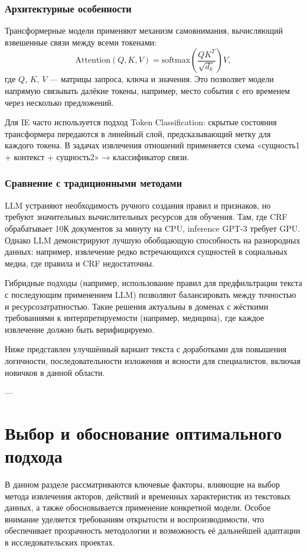 \subsubsection{Архитектурные особенности}

Трансформерные модели применяют механизм самовнимания, вычисляющий взвешенные связи между всеми токенами:
\[
\text{Attention}(Q, K, V) = \text{softmax}\left(\frac{QK^T}{\sqrt{d_k}}\right)V,
\]
где \(Q\), \(K\), \(V\) — матрицы запроса, ключа и значения. Это позволяет модели напрямую связывать далёкие токены, например, место события с его временем через несколько предложений.

Для IE часто используется подход Token Classification: скрытые состояния трансформера передаются в линейный слой, предсказывающий метку для каждого токена. В задачах извлечения отношений применяется схема «сущность1 + контекст + сущность2» → классификатор связи.

\subsubsection{Сравнение с традиционными методами}

LLM устраняют необходимость ручного создания правил и признаков, но требуют значительных вычислительных ресурсов для обучения. Там, где CRF обрабатывает 10К документов за минуту на CPU, inference GPT-3 требует GPU. Однако LLM демонстрируют лучшую обобщающую способность на разнородных данных: например, извлечение редко встречающихся сущностей в социальных медиа, где правила и CRF недостаточны.

Гибридные подходы (например, использование правил для предфильтрации текста с последующим применением LLM) позволяют балансировать между точностью и ресурсозатратностью. Такие решения актуальны в доменах с жёсткими требованиями к интерпретируемости (например, медицина), где каждое извлечение должно быть верифицируемо.

Ниже представлен улучшённый вариант текста с доработками для повышения логичности, последовательности изложения и ясности для специалистов, включая новичков в данной области.

---

\section{Выбор и обоснование оптимального подхода}

В данном разделе рассматриваются ключевые факторы, влияющие на выбор метода извлечения акторов, действий и временных характеристик из текстовых данных, а также обосновывается применение конкретной модели. Особое внимание уделяется требованиям открытости и воспроизводимости, что обеспечивает прозрачность методологии и возможность её дальнейшей адаптации в исследовательских проектах.

